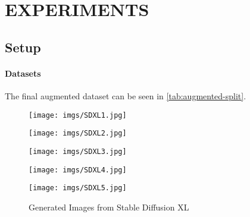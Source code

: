 \section{\uppercase{experiments}}
\label{sec:experiments}

\subsection{Setup}
\paragraph{Datasets}The final augmented dataset can be seen in \autoref{tab:augmented-split}.

\begin{figure*}[t]
    \centering
        \caption*{Generated Images from Stable Diffusion XL}
    \begin{minipage}{\textwidth}
        \centering
        \begin{minipage}{0.18\textwidth}
            \centering
            \texttt{[image: imgs/SDXL1.jpg]}
        \end{minipage} \hfill
        \begin{minipage}{0.18\textwidth}
            \centering
            \texttt{[image: imgs/SDXL2.jpg]}
        \end{minipage} \hfill
        \begin{minipage}{0.18\textwidth}
            \centering
            \texttt{[image: imgs/SDXL3.jpg]}
        \end{minipage} \hfill
        \begin{minipage}{0.18\textwidth}
            \centering
            \texttt{[image: imgs/SDXL4.jpg]}
        \end{minipage} \hfill
        \begin{minipage}{0.18\textwidth}
            \centering
            \texttt{[image: imgs/SDXL5.jpg]}
        \end{minipage}
    \end{minipage}
    

\end{figure*}

